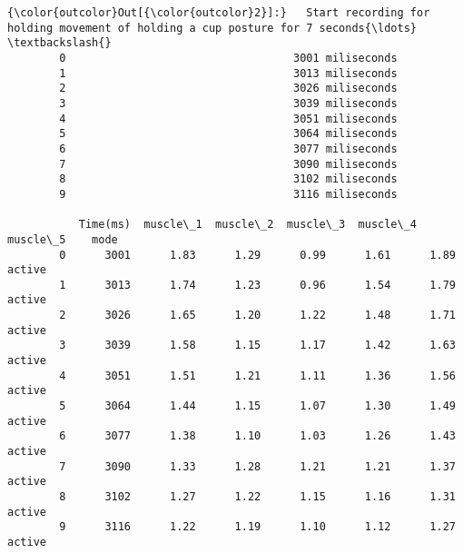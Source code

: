 \documentclass[11pt]{article}
\begin{document}
\begin{Verbatim}[commandchars=\\\{\}]
{\color{outcolor}Out[{\color{outcolor}2}]:}   Start recording for holding movement of holding a cup posture for 7 seconds{\ldots}  \textbackslash{}
        0                                   3001 miliseconds                               
        1                                   3013 miliseconds                               
        2                                   3026 miliseconds                               
        3                                   3039 miliseconds                               
        4                                   3051 miliseconds                               
        5                                   3064 miliseconds                               
        6                                   3077 miliseconds                               
        7                                   3090 miliseconds                               
        8                                   3102 miliseconds                               
        9                                   3116 miliseconds                               
        
           Time(ms)  muscle\_1  muscle\_2  muscle\_3  muscle\_4  muscle\_5    mode  
        0      3001      1.83      1.29      0.99      1.61      1.89  active  
        1      3013      1.74      1.23      0.96      1.54      1.79  active  
        2      3026      1.65      1.20      1.22      1.48      1.71  active  
        3      3039      1.58      1.15      1.17      1.42      1.63  active  
        4      3051      1.51      1.21      1.11      1.36      1.56  active  
        5      3064      1.44      1.15      1.07      1.30      1.49  active  
        6      3077      1.38      1.10      1.03      1.26      1.43  active  
        7      3090      1.33      1.28      1.21      1.21      1.37  active  
        8      3102      1.27      1.22      1.15      1.16      1.31  active  
        9      3116      1.22      1.19      1.10      1.12      1.27  active  
\end{Verbatim}
            
\end{document}
